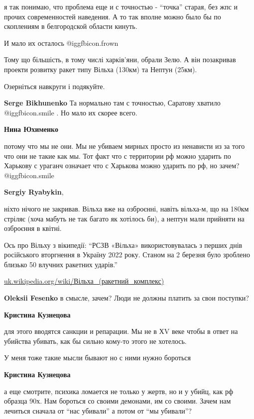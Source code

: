 \begin{itemize}
\begin{itemize}
я так понимаю, что проблема еще и с точностью - \enquote{точка} старая, без жпс и
прочих современностей наведения. А то так вполне можно было бы по скоплениям в
белгородской области кинуть.

И мало их осталось  @igg{fbicon.frown} 


Тому що більшість, в тому числі харків'яни, обрали Зелю. А він позакривав
проекти розвитку ракет типу Вільха (130км) та Нептун (25км).

Озерніться навкруги і подякуйте.

\textbf{Serge Bikhunenko} Та нормально там с точностью, Саратову хватило  @igg{fbicon.smile} . Но мало их скорее всего.

\textbf{Нина Юхименко} 

потому что мы не они. Мы не убиваем мирных просто из ненависти из за того что
они не такие как мы. Тот факт что с территории рф можно ударить по Харькову с
ураганч означает что с Харькова можно ударить по рф, но зачем?  @igg{fbicon.smile} 

\textbf{Sergiy Ryabykin}, 

ніхто нічого не закривав. Вільха вже на озброєнні, навіть вільха-м, що на 180км
стріляє (хоча мабуть не так багато як хотілось би), а нептун мали прийняти на
озброєння в квітні.

Ось про Вільху з вікипедії: \enquote{РСЗВ «Вільха» використовувалась з перших днів
російського вторгнення в Україну 2022 року. Станом на 2 березня було зроблено
близько 50 влучних ракетних ударів.}

\url{uk.wikipedia.org/wiki/Вільха_(ракетний_комплекс)}

\textbf{Oleksii Fesenko} в смысле, зачем? Люди не должны платить за свои поступки?

\textbf{Кристина Кузнецова} 

для этого вводятся санкции и репарации. Мы не в ХV веке чтобы в ответ на
убийства убивать, как бы сильно кому-то этого не хотелось.

У меня тоже такие мысли бывают но с ними нужно бороться

\textbf{Кристина Кузнецова} 

а еще смотрите, психика ломается не только у жертв, но и у убийц, как рф
образца 90х. Нам бороться со своими демонами, им со своими. Зачем нам лечиться
сначала от \enquote{нас убивали} а потом от \enquote{мы убивали}?


\end{itemize}
\end{itemize}
